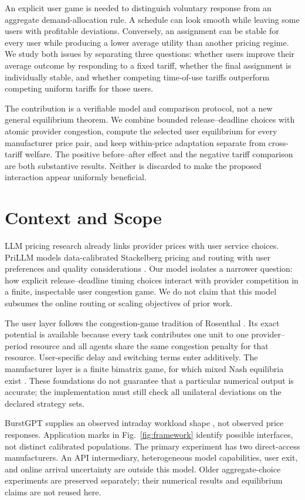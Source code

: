 \documentclass[11pt,a4paper]{article}
\begin{document}
An explicit user game is needed to distinguish voluntary response from an aggregate demand-allocation rule. A schedule can look smooth while leaving some users with profitable deviations. Conversely, an assignment can be stable for every user while producing a lower average utility than another pricing regime. We study both issues by separating three questions: whether users improve their average outcome by responding to a fixed tariff, whether the final assignment is individually stable, and whether competing time-of-use tariffs outperform competing uniform tariffs for those users.

The contribution is a verifiable model and comparison protocol, not a new general equilibrium theorem. We combine bounded release--deadline choices with atomic provider congestion, compute the selected user equilibrium for every manufacturer price pair, and keep within-price adaptation separate from cross-tariff welfare. The positive before--after effect and the negative tariff comparison are both substantive results. Neither is discarded to make the proposed interaction appear uniformly beneficial.

\section{Context and Scope}
LLM pricing research already links provider prices with user service choices. PriLLM models data-calibrated Stackelberg pricing and routing with user preferences and quality considerations \cite{guo2026prillm}. Our model isolates a narrower question: how explicit release--deadline timing choices interact with provider competition in a finite, inspectable user congestion game. We do not claim that this model subsumes the online routing or scaling objectives of prior work.

The user layer follows the congestion-game tradition of Rosenthal \cite{rosenthal1973class}. Its exact potential is available because every task contributes one unit to one provider--period resource and all agents share the same congestion penalty for that resource. User-specific delay and switching terms enter additively. The manufacturer layer is a finite bimatrix game, for which mixed Nash equilibria exist \cite{nash1951noncooperative}. These foundations do not guarantee that a particular numerical output is accurate; the implementation must still check all unilateral deviations on the declared strategy sets.

BurstGPT supplies an observed intraday workload shape \cite{wang2025burstgpt}, not observed price responses. Application marks in Fig.~\ref{fig:framework} identify possible interfaces, not distinct calibrated populations. The primary experiment has two direct-access manufacturers. An API intermediary, heterogeneous model capabilities, user exit, and online arrival uncertainty are outside this model. Older aggregate-choice experiments are preserved separately; their numerical results and equilibrium claims are not reused here.
\end{document}
